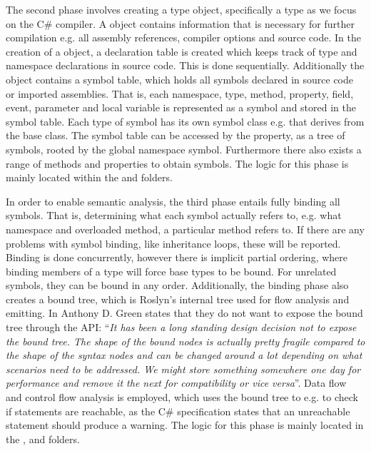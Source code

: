 The second phase involves creating a  type object, specifically a  type as we focus on the C\# compiler. A  object contains information that is necessary for further compilation e.g. all assembly references, compiler options and source code. In the creation of a  object, a declaration table is created which keeps track of type and namespace declarations in source code\cite{sadovRoslynPerf}. This is done sequentially\cite{sadovRoslynPerf}. Additionally the  object contains a symbol table, which holds all symbols declared in source code or imported assemblies. That is, each namespace, type, method, property, field, event, parameter and local variable is represented as a symbol and stored in the symbol table\cite[p. 14]{ng2012roslyn}. Each type of symbol has its own symbol class e.g.  that derives from the base  class. The symbol table can be accessed by the  property, as a tree of symbols, rooted by the global namespace symbol. Furthermore there also exists a range of methods and properties to obtain symbols. The logic for this phase is mainly located within the  and  folders.

In order to enable semantic analysis, the third phase entails fully binding all symbols. That is, determining what each symbol actually refers to, e.g. what namespace and overloaded method, a particular method refers to. If there are any problems with symbol binding, like inheritance loops, these will be reported. Binding is done concurrently, however there is implicit partial ordering, where binding members of a type will force base types to be bound. For unrelated symbols, they can be bound in any order\cite{sadovRoslynPerf}. Additionally, the binding phase also creates a bound tree, which is Roslyn's internal tree used for flow analysis and emitting. In \cite{roslynBinder} Anthony D. Green states that they do not want to expose the bound tree through the \ac{API}: ``\textit{It has been a long standing design decision not to expose the bound tree. The shape of the bound nodes is actually pretty fragile compared to the shape of the syntax nodes and can be changed around a lot depending on what scenarios need to be addressed. We might store something somewhere one day for performance and remove it the next for compatibility or vice versa}''. Data flow and control flow analysis is employed, which uses the bound tree to e.g. to check if statements are reachable, as the C\# specification states that an unreachable statement should produce a warning\cite{gafter2011}. The logic for this phase is mainly located in the ,  and  folders.


